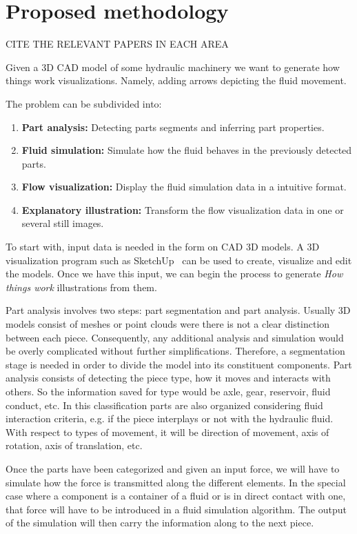 \chapter{Proposed methodology}

CITE THE RELEVANT PAPERS IN EACH AREA

Given a 3D CAD model of some hydraulic machinery we want to generate how things work visualizations.
Namely, adding arrows depicting the fluid movement.

The problem can be subdivided into:
\begin{enumerate}
\item \textbf{Part analysis:} Detecting parts segments and inferring part properties.
\item \textbf{Fluid simulation:} Simulate how the fluid behaves in the previously detected parts.
\item \textbf{Flow visualization:} Display the fluid simulation data in a intuitive format.
\item \textbf{Explanatory illustration:} Transform the flow visualization data in one or several still images.
\end{enumerate}

To start with, input data is needed in the form on CAD 3D models.
A 3D visualization program such as SketchUp~\cite{Trimble2014} can be used to create, visualize and edit the models.
Once we have this input, we can begin the process to generate \textit{How things work} illustrations from them.

Part analysis involves two steps: part segmentation and part analysis.
Usually 3D models consist of meshes or point clouds were there is not a clear distinction between each piece.
Consequently, any additional analysis and simulation would be overly complicated without further simplifications.  
Therefore, a segmentation stage is needed in order to divide the model into its constituent components.
Part analysis consists of detecting the piece type, how it moves and interacts with others.
So the information saved for type would be axle, gear, reservoir, fluid conduct, etc.
In this classification parts are also organized considering fluid interaction criteria, e.g. if the piece interplays or not with the hydraulic fluid.
With respect to types of movement, it will be direction of movement, axis of rotation, axis of translation, etc.

Once the parts have been categorized and given an input force, we will have to simulate how the force is transmitted along the different elements.
In the special case where a component is a container of a fluid or is in direct contact with one, that force will have to be introduced in a fluid simulation algorithm.
The output of the simulation will then carry the information along to the next piece.

